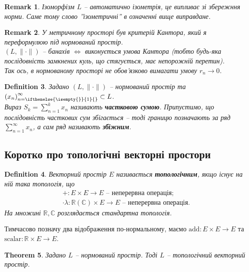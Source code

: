 \documentclass[a4paper, 10pt]{article}
\theoremstyle{theoremdd}
\newtheorem{theorem}{Theorem}[subsection]
\theoremstyle{theoremdd}
\newtheorem{definition}[theorem]{Definition}
\theoremstyle{theoremdd}
\theoremstyle{theoremdd}
\theoremstyle{theoremdd}
\theoremstyle{theoremdd}
\newtheorem{remark}[theorem]{Remark}
\theoremstyle{theoremdd}
\theoremstyle{theoremdd}
\newcommand{\sequence}[2][]{\left({#2}\right)_{n=\ifthenelse{\isempty{#1}}{1}{#1}}^{\infty}}
\begin{document}
\begin{remark}
Ізоморфізм $L$ -- автоматично ізометрія, це випливає зі збережння норми. Саме тому слово ''ізометричні'' в означенні вище виправдане.
\end{remark}

\begin{remark}
У метричному просторі був критерій Кантора, який я переформулюю під нормований простір.\\
$(L,\|\cdot \|)$ -- банахів $\iff$ виконується умова Кантора (тобто будь-яка послідовність замкнених куль, що стягується, має непорожній перетин).\\
Так ось, в нормованому просторі не обов'язково вимагати умову $r_n \to 0$.
\end{remark}

\begin{definition}
Задано $(L, \|\cdot\|)$ -- нормований простір та $\sequence{x_n} \subset L$.\\
Вираз $S_k = \displaystyle\sum_{n=1}^k x_n$ називають \textbf{частковою сумою}. Припустимо, що послідовність часткових сум збігається -- тоді границю позначають за ряд $\displaystyle\sum_{n=1}^\infty x_n$, а сам ряд називають \textbf{збіжним}.
\end{definition}

\subsection{Коротко про топологічні векторні простори}
\begin{definition}
Векторний простір $E$ називається \textbf{топологічним}, якщо існує на ній така топологія, що
\begin{align*}
+ \colon E \times E \to E \text{ -- неперервна операція}; \\
\cdot \lambda \colon \mathbb{R} (\mathbb{C}) \times E \to E \text{ -- неперервна операція.}
\end{align*}
\noindent
На множині $\mathbb{R}, \mathbb{C}$ розглядається стандартна топологія.
\end{definition}
\noindent
Тимчасово позначу два відображення по-нормальному, маємо $\text{add} \colon E \times E \to E$ та $\text{scalar} \colon \mathbb{R} \times E \to E$.

\begin{theorem}
Задано $L$ -- нормований простір. Тоді $L$ -- топологічний векторний простір.
\end{theorem}
\end{document}
